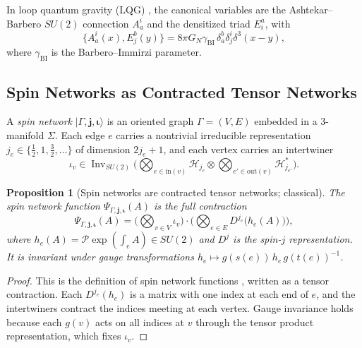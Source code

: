 \documentclass[11pt,a4paper,reqno]{amsart}
\newtheorem{proposition}[theorem]{Proposition}
\theoremstyle{definition}
\numberwithin{equation}{section}
\begin{document}
In loop quantum gravity (LQG) \cite{rovelli2004quantum, ashtekar2004background}, the canonical variables are the Ashtekar--Barbero $SU(2)$ connection $A_a^i$ and the densitized triad $E_i^a$, with
\begin{equation}
    \{A_a^i(x), E_j^b(y)\} = 8\pi G_N \gamma_{\mathrm{BI}} \, \delta_a^b \delta_j^i \delta^3(x - y),
\end{equation}
where $\gamma_{\mathrm{BI}}$ is the Barbero--Immirzi parameter.

\subsection{Spin Networks as Contracted Tensor Networks}
A \emph{spin network} $|\Gamma, \mathbf{j}, \boldsymbol{\iota}\rangle$ is an oriented graph $\Gamma = (V, E)$ embedded in a $3$-manifold $\Sigma$. Each edge $e$ carries a nontrivial irreducible representation $j_e \in \{\frac12, 1, \frac32, \dots\}$ of dimension $2j_e + 1$, and each vertex carries an intertwiner
\begin{equation}
    \iota_v \in \operatorname{Inv}_{SU(2)}\Big( \textstyle\bigotimes_{e \in \mathrm{in}(v)} \mathcal{H}_{j_e} \otimes \bigotimes_{e' \in \mathrm{out}(v)} \mathcal{H}_{j_{e'}}^* \Big).
\end{equation}

\begin{proposition}[Spin networks are contracted tensor networks; classical]
\label{thm:spin_net_tensor_equiv}
The spin network function $\Psi_{\Gamma, \mathbf{j}, \boldsymbol{\iota}}(A)$ is the full contraction
\begin{equation}
    \label{eq:spin_net_contraction}
    \Psi_{\Gamma, \mathbf{j}, \boldsymbol{\iota}}(A) = \Big( \textstyle\bigotimes_{v \in V} \iota_v \Big) \cdot \Big( \bigotimes_{e \in E} D^{j_e}\big(h_e(A)\big) \Big),
\end{equation}
where $h_e(A) = \mathcal{P} \exp( \int_e A ) \in SU(2)$ and $D^{j}$ is the spin-$j$ representation. It is invariant under gauge transformations $h_e \mapsto g(s(e))\, h_e\, g(t(e))^{-1}$.
\end{proposition}
\begin{proof}
This is the definition of spin network functions \cite{rovelli2004quantum}, written as a tensor contraction. Each $D^{j_e}(h_e)$ is a matrix with one index at each end of $e$, and the intertwiners contract the indices meeting at each vertex. Gauge invariance holds because each $g(v)$ acts on all indices at $v$ through the tensor product representation, which fixes $\iota_v$.
\end{proof}
\end{document}
